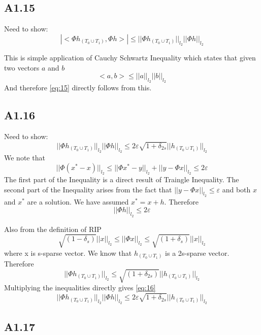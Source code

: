 \documentclass{article}
\newcommand{\ltwo}[1]{
  ||#1||_{l_2}
}
\newcommand{\htzo}{
  h_{(T_0 \cup T_1)}
}
\begin{document}
\subsection*{A1.15}
Need to show:
\begin{equation}
  \label{eq:15}
  |<\Phi\htzo,\Phi h>| \le \ltwo{\Phi\htzo}\ltwo{\Phi h}
\end{equation}

This is simple application of Cauchy Schwartz Inequality which states that given two vectors $a$ and $b$
$$<a,b> \le \ltwo{a}\ltwo{b}$$
And therefore \ref{eq:15} directly follows from this.

\subsection*{A1.16}
Need to show:
\begin{equation}
  \label{eq:16}
  \ltwo{\Phi\htzo}\ltwo{\Phi h} \le 2 \varepsilon \sqrt{1+\delta_{2s}}\ltwo{\htzo}
\end{equation}
We note that
$$\ltwo{\Phi(x^* - x)} \le \ltwo{\Phi x^* - y} + \ltwo{y - \Phi x} \le 2\varepsilon$$
The first part of the Inequality is a direct result of Traingle Inequality. The second part of the Inequality arises from the fact that
$\ltwo{y - \Phi x} \le \varepsilon$ and both $x$ and $x^*$ are a solution.
We have assumed $x^* = x + h$. Therefore
$$\ltwo{\Phi h} \le 2\varepsilon$$

Also from the definition of RIP
$$\sqrt{(1 - \delta_{s})} \ltwo{x} \le \ltwo{\Phi x} \le \sqrt{(1+\delta_s)} \ltwo{x}$$
where x is s-sparse vector.
We know that $\htzo$ is a 2s-sparse vector. Therefore
$$\ltwo{\Phi \htzo} \le \sqrt{(1+\delta_{2s})}\ltwo{\htzo}$$
Multiplying the inequalities directly gives \ref{eq:16}
$$\ltwo{\Phi\htzo}\ltwo{\Phi h} \le 2 \varepsilon \sqrt{1+\delta_{2s}}\ltwo{\htzo}$$

\subsection*{A1.17}
\end{document}
